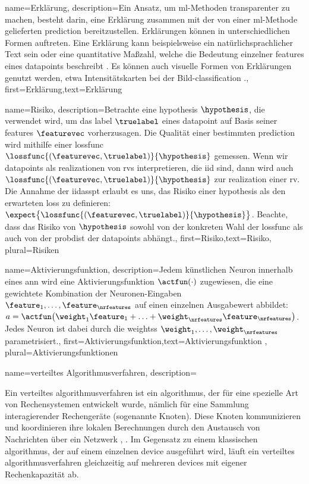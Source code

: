 {{{
{name={Erklärung},
	description={Ein Ansatz, um \gls{ml}-Methoden transparenter zu machen, besteht darin, 
		eine Erklärung zusammen mit der von einer \gls{ml}-Methode gelieferten 
		\gls{prediction} bereitzustellen. Erklärungen können in unterschiedlichen Formen auftreten. 
		Eine Erklärung kann beispielsweise ein natürlichsprachlicher Text sein oder eine quantitative 
		Maßzahl, welche die Bedeutung einzelner \gls{feature}s eines \gls{datapoint}s beschreibt \cite{Molnar2019}. 
		Es können auch visuelle Formen von Erklärungen genutzt werden, etwa Intensitätskarten bei der Bild-\gls{classification} \cite{GradCamPaper}.},
	first={Erklärung},text={Erklärung} 
}

{name={Risiko},
	description={Betrachte eine \gls{hypothesis} $\hypothesis$, die verwendet wird, um das \gls{label} 
		$\truelabel$ eines \gls{datapoint} auf Basis seiner \gls{feature}s $\featurevec$ vorherzusagen. 
		Die Qualität einer bestimmten \gls{prediction} wird mithilfe einer \gls{lossfunc} 
		$\lossfunc{(\featurevec,\truelabel)}{\hypothesis}$ gemessen. Wenn wir \gls{datapoint}s als 
		\gls{realization}en von \glspl{rv} interpretieren, die \gls{iid} sind, dann wird auch 
		$\lossfunc{(\featurevec,\truelabel)}{\hypothesis}$ zur \gls{realization} einer \gls{rv}. 
		Die Annahme der \gls{iidasspt} erlaubt es uns, das Risiko einer \gls{hypothesis} als den erwarteten 
		\gls{loss} zu definieren: $\expect \big\{\lossfunc{(\featurevec,\truelabel)}{\hypothesis} \big\}$. 
		Beachte, dass das Risiko von $\hypothesis$ sowohl von der konkreten Wahl der \gls{lossfunc} 
		als auch von der \gls{probdist} der \gls{datapoint}s abhängt.},
	first={Risiko},text={Risiko}, plural={Risiken}
}

{name={Aktivierungsfunktion},
	description={Jedem künstlichen Neuron innerhalb eines \gls{ann} 
		wird eine Aktivierungsfunktion $\actfun(\cdot)$ zugewiesen, die eine gewichtete 
		Kombination der Neuronen-Eingaben $\feature_{1},\ldots,\feature_{\nrfeatures}$ 
		auf einen einzelnen Ausgabewert abbildet: 
		$a = \actfun\big(\weight_{1} \feature_{1}+\ldots+\weight_{\nrfeatures} \feature_{\nrfeatures} \big)$. 
		Jedes Neuron ist dabei durch die \glspl{weights} $\weight_{1},\ldots,\weight_{\nrfeatures}$ parametrisiert.},
	first={Aktivierungsfunktion},text={Aktivierungsfunktion} , plural={Aktivierungsfunktionen}
}

{name={verteiltes Algorithmusverfahren},
	description={Ein verteiltes \gls{algorithmus}verfahren ist ein \gls{algorithmus}, 
		der für eine spezielle Art von Rechensystemen entwickelt wurde, nämlich für eine Sammlung 
		interagierender Rechengeräte (sogenannte Knoten). Diese Knoten kommunizieren und koordinieren 
		ihre lokalen Berechnungen durch den Austausch von Nachrichten über ein Netzwerk 
		\cite{IntroDistAlg}, \cite{ParallelDistrBook}. Im Gegensatz zu einem klassischen \gls{algorithmus}, 
		der auf einem einzelnen \gls{device} ausgeführt wird, läuft ein verteiltes \gls{algorithmus}verfahren 
		gleichzeitig auf mehreren \gls{device}s mit eigener Rechenkapazität ab. 
		
}}}}}
